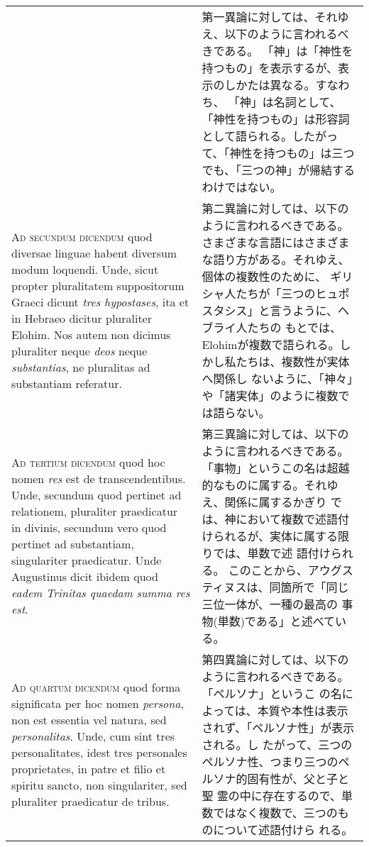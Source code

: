 \documentclass[10pt]{jsarticle} %
\begin{document}
\begin{longtable}{p{21em}p{21em}}
&

第一異論に対しては、それゆえ、以下のように言われるべきである。
「神」は「神性を持つもの」を表示するが、表示のしかたは異なる。すなわち、
 「神」は名詞として、「神性を持つもの」は形容詞として語られる。したがっ
 て、「神性を持つもの」は三つでも、「三つの神」が帰結するわけではない。


\\



{\scshape Ad secundum dicendum} quod diversae linguae habent diversum modum
loquendi. Unde, sicut propter pluralitatem suppositorum Graeci dicunt
{\itshape tres hypostases}, ita et in Hebraeo dicitur pluraliter Elohim. Nos autem
non dicimus pluraliter neque {\itshape deos} neque {\itshape substantias}, ne pluralitas ad
substantiam referatur.


&

第二異論に対しては、以下のように言われるべきである。
さまざまな言語にはさまざまな語り方がある。それゆえ、個体の複数性のために、
 ギリシャ人たちが「三つのヒュポスタシス」と言うように、ヘブライ人たちの
 もとでは、Elohimが複数で語られる。しかし私たちは、複数性が実体へ関係し
 ないように、「神々」や「諸実体」のように複数では語らない。


\\



{\scshape Ad tertium dicendum} quod hoc nomen {\itshape res} est de transcendentibus. Unde,
secundum quod pertinet ad relationem, pluraliter praedicatur in divinis,
secundum vero quod pertinet ad substantiam, singulariter
praedicatur. Unde Augustinus dicit ibidem quod {\itshape eadem Trinitas quaedam
summa res est}.


&

第三異論に対しては、以下のように言われるべきである。
「事物」というこの名は超越的なものに属する。それゆえ、関係に属するかぎり
 では、神において複数で述語付けられるが、実体に属する限りでは、単数で述
 語付けられる。
このことから、アウグスティヌスは、同箇所で「同じ三位一体が、一種の最高の
 事物(単数)である」と述べている。


\\



{\scshape Ad quartum dicendum} quod forma significata per hoc nomen {\itshape persona}, non
est essentia vel natura, sed {\itshape personalitas}. Unde, cum sint tres
personalitates, idest tres personales proprietates, in patre et filio et
spiritu sancto, non singulariter, sed pluraliter praedicatur de tribus.


&


第四異論に対しては、以下のように言われるべきである。「ペルソナ」というこ
 の名によっては、本質や本性は表示されず、「ペルソナ性」が表示される。し
 たがって、三つのペルソナ性、つまり三つのペルソナ的固有性が、父と子と聖
 霊の中に存在するので、単数ではなく複数で、三つのものについて述語付けら
 れる。


\end{longtable}
\newpage
\end{document}
